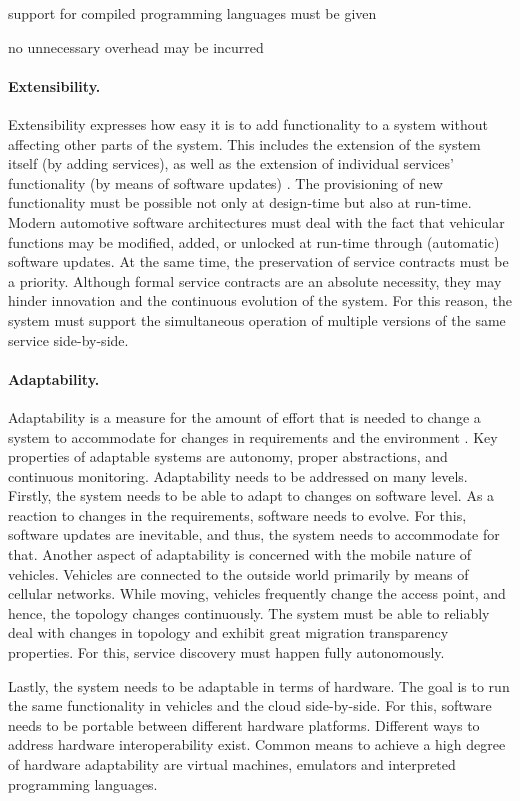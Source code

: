 support for compiled programming languages must be given

no unnecessary overhead may be incurred


\paragraph{Extensibility.} 
Extensibility expresses how easy it is to add functionality to a system without affecting other parts of the system. This includes the extension of the system itself (by adding services), as well as the extension of individual services' functionality (by means of software updates) \cite{o2007quality}. The provisioning of new functionality must be possible not only at design-time but also at run-time. Modern automotive software architectures must deal with the fact that vehicular functions may be modified, added, or unlocked at run-time through (automatic) software updates. At the same time, the preservation of service contracts must be a priority. Although formal service contracts are an absolute necessity, they may hinder innovation and the continuous evolution of the system. For this reason, the system must support the simultaneous operation of multiple versions of the same service side-by-side.


\paragraph{Adaptability.}
Adaptability is a measure for the amount of effort that is needed to change a system to accommodate for changes in requirements and the environment \cite{o2007quality}. Key properties of adaptable systems are autonomy, proper abstractions, and continuous monitoring. Adaptability needs to be addressed on many levels. Firstly, the system needs to be able to adapt to changes on software level. As a reaction to changes in the requirements, software needs to evolve. For this, software updates are inevitable, and thus, the system needs to accommodate for that. Another aspect of adaptability is concerned with the mobile nature of vehicles. Vehicles are connected to the outside world primarily by means of cellular networks. While moving, vehicles frequently change the access point, and hence, the topology changes continuously. The system must be able to reliably deal with changes in topology and exhibit great migration transparency properties. For this, service discovery must happen fully autonomously. 

Lastly, the system needs to be adaptable in terms of hardware. The goal is to run the same functionality in vehicles and the cloud side-by-side. For this, software needs to be portable between different hardware platforms. Different ways to address hardware interoperability exist. Common means to achieve a high degree of hardware adaptability are virtual machines, emulators and interpreted programming languages.


